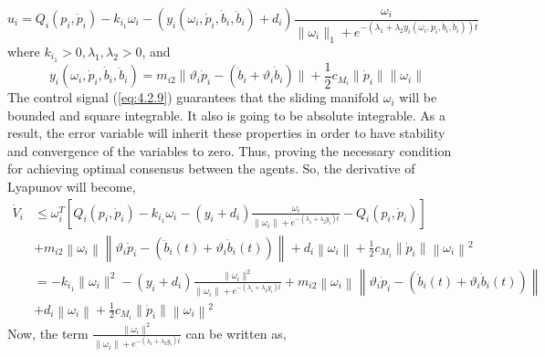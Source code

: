     \begin{equation}\label{eq:4.2.9}
        u_i = Q_i(p_i, \dot{p}_i) - k_{i_1}\omega_i - \left(y_i(\omega_i, \dot{p}_i, \dot{b}_i, \ddot{b}_i) + d_i\right) \frac{\omega_i}{\lVert \omega_i \rVert_1 + e^{-\left(\lambda_1 + \lambda_2 y_i\left(\omega_i, \dot{p}_i, \dot{b}_i, \ddot{b}_i \right) \right) t}}
    \end{equation}
    where $k_{i_1} > 0, \lambda_1, \lambda_2 > 0$, and
    \begin{equation}\label{eq:4.2.10}
        y_i(\omega_i, \dot{p}_i, \dot{b}_i, \ddot{b}_i) = m_{i2} \lVert \vartheta_i \dot{p}_i - (\ddot{b}_i + \vartheta_i \dot{b}_i) \rVert + \frac{1}{2}c_{M_i} \lVert \dot{p}_i \rVert \lVert \omega_i \rVert
    \end{equation}
    The control signal (\ref{eq:4.2.9}) guarantees that the sliding manifold $\omega_i$ will be bounded and square integrable. It also is going to be absolute integrable. As a result, the error variable will inherit these properties in order to have stability and convergence of the variables to zero. Thus, proving the necessary condition for achieving optimal consensus between the agents. So, the derivative of Lyapunov will become,
    \begin{equation*}
        \begin{align}
            \dot{V}_i &\leq \omega_i^T \left[Q_i(p_i, \dot{p}_i) - k_{i_1}\omega_i - \left(y_i + d_i\right) \frac{\omega_i}{\lVert \omega_i \rVert + e^{-\left(\lambda_1 + \lambda_2 y_i\right)t}} - Q_i(p_i,\dot{p}_i)\right]\\
            & + m_{i2} \left\lVert \omega_i \right\rVert \left \lVert \vartheta_i\dot{p}_i - (\ddot{b}_i(t) + \vartheta_i \dot{b}_i(t)) \right\rVert  + d_i\left\lVert \omega_i \right\rVert +\frac{1}{2}c_{M_i} \lVert \dot{p}_i \rVert\left\lVert \omega_i \right\rVert^2\\
            &= -k_{i_1} \lVert \omega_i \rVert^2 - (y_i + d_i)\frac{\lVert \omega_i \rVert^2}{\lVert \omega_i \rVert + e^{-\left(\lambda_1 + \lambda_2 y_i\right)t}}  + m_{i2} \left\lVert \omega_i \right\rVert \left \lVert \vartheta_i\dot{p}_i - (\ddot{b}_i(t) + \vartheta_i \dot{b}_i(t)) \right\rVert\\
            &+  d_i\left\lVert \omega_i \right\rVert +\frac{1}{2}c_{M_i} \lVert \dot{p}_i \rVert\left\lVert \omega_i \right\rVert^2
        \end{align}
    \end{equation*}
   Now, the term $\frac{\lVert \omega_i \rVert^2}{\lVert \omega_i \rVert + e^{-\left(\lambda_1 + \lambda_2 y_i\right)t}}$ can be written as,
